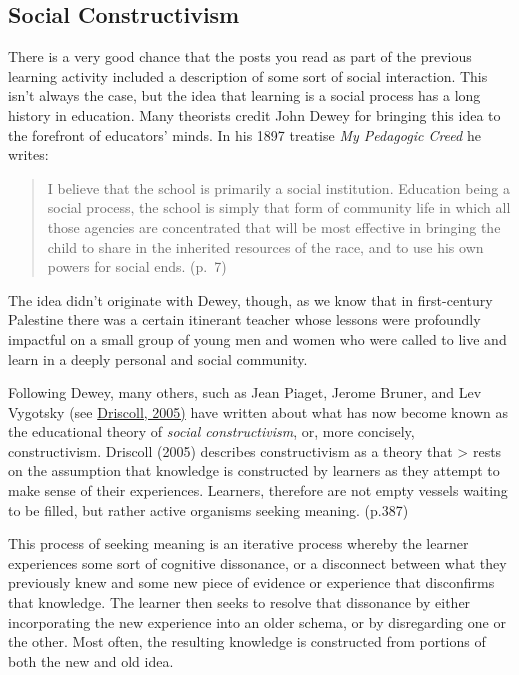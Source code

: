 \documentclass[
]{book}
\begin{document}
\hypertarget{social-constructivism}{%
\subsection*{Social Constructivism}\label{social-constructivism}}

There is a very good chance that the posts you read as part of the previous learning activity included a description of some sort of social interaction. This isn't always the case, but the idea that learning is a social process has a long history in education. Many theorists credit John Dewey for bringing this idea to the forefront of educators' minds. In his 1897 treatise \emph{My Pedagogic Creed} he writes:

\begin{quote}
I believe that the school is primarily a social institution. Education being a social process, the school is simply that form of community life in which all those agencies are concentrated that will be most effective in bringing the child to share in the inherited resources of the race, and to use his own powers for social ends. (p.~7)
\end{quote}

The idea didn't originate with Dewey, though, as we know that in first-century Palestine there was a certain itinerant teacher whose lessons were profoundly impactful on a small group of young men and women who were called to live and learn in a deeply personal and social community.

Following Dewey, many others, such as Jean Piaget, Jerome Bruner, and Lev Vygotsky (see \href{https://twu.idm.oclc.org/login?url=http://search.ebscohost.com/login.aspx?direct=true\&db=cat05965a\&AN=alc.1254633\&site=eds-live}{Driscoll, 2005)} have written about what has now become known as the educational theory of \emph{social constructivism}, or, more concisely, constructivism. Driscoll (2005) describes constructivism as a theory that
\textgreater{} rests on the assumption that knowledge is constructed by learners as they attempt to make sense of their experiences. Learners, therefore are not empty vessels waiting to be filled, but rather active organisms seeking meaning. (p.387)

This process of seeking meaning is an iterative process whereby the learner experiences some sort of cognitive dissonance, or a disconnect between what they previously knew and some new piece of evidence or experience that disconfirms that knowledge. The learner then seeks to resolve that dissonance by either incorporating the new experience into an older schema, or by disregarding one or the other. Most often, the resulting knowledge is constructed from portions of both the new and old idea.
\end{document}
